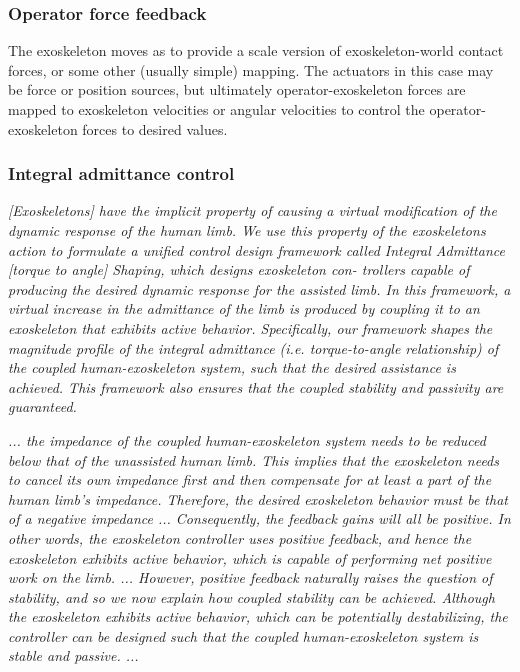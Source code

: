 \documentclass[letterpaper,12pt,fullpage]{article}
\begin{document}
\subsubsection{Operator force feedback}

The exoskeleton moves as to provide a scale version of exoskeleton-world
contact forces, or some other (usually simple) mapping. 
The actuators in this case may be force or
position sources, but ultimately operator-exoskeleton forces are mapped
to exoskeleton velocities or angular velocities to control the
operator-exoskeleton forces to desired values.

\subsubsection{Integral admittance control}

{\it [Exoskeletons] have the implicit property
of causing a virtual modification of the dynamic response of
the human limb. We use this property of the exoskeletons
action to formulate a unified control design framework called
Integral Admittance [torque to angle] Shaping, which designs exoskeleton con-
trollers capable of producing the desired dynamic response
for the assisted limb. In this framework, a virtual increase
in the admittance of the limb is produced by coupling it
to an exoskeleton that exhibits active behavior. Specifically,
our framework shapes the magnitude profile of the integral
admittance (i.e. torque-to-angle relationship) of the coupled
human-exoskeleton system, such that the desired assistance is
achieved. This framework also ensures that the coupled stability
and passivity are guaranteed.}~\cite{Nagarajan_etal_2015}

{\it ... the impedance of the coupled human-exoskeleton
system needs to be reduced below that of the unassisted
human limb. This implies that the exoskeleton needs to
cancel its own impedance first and then compensate for
at least a part of the human limb’s impedance. Therefore,
the desired exoskeleton behavior must be that of a negative
impedance ... Consequently,
the feedback gains will all be
positive. In other words, the exoskeleton controller uses
positive feedback, and hence the exoskeleton exhibits active
behavior, which is capable of performing net positive work
on the limb. ...
However, positive feedback naturally raises the question of
stability, and so we now explain how coupled stability can be
achieved. Although the exoskeleton exhibits active behavior,
which can be potentially destabilizing, the controller can be
designed such that the coupled human-exoskeleton system
is stable and passive. ... 
}~\cite{Nagarajan_etal_2015}
\end{document}
